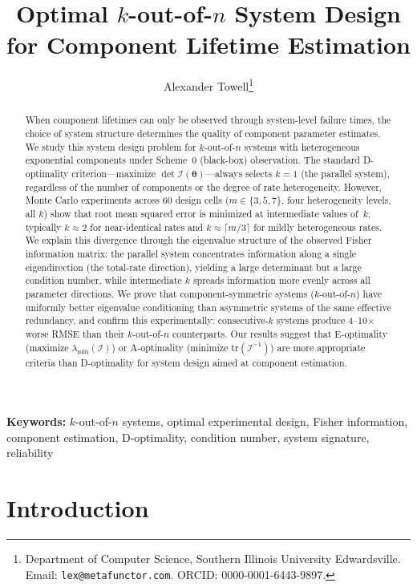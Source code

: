 \documentclass[12pt]{article}
\title{Optimal \texorpdfstring{$k$}{k}-out-of-\texorpdfstring{$n$}{n} System Design\\ for Component Lifetime Estimation}
\author{Alexander Towell\thanks{Department of Computer Science,
  Southern Illinois University Edwardsville.
  Email: \texttt{lex@metafunctor.com}.
  ORCID: 0000-0001-6443-9897.}}
\date{}
\theoremstyle{definition}
\theoremstyle{remark}
\newcommand{\tr}{\mathrm{tr}}
\newcommand{\bthet}{\boldsymbol{\theta}}
\begin{document}
\maketitle

\begin{abstract}
When component lifetimes can only be observed through system-level
failure times, the choice of system structure determines the quality
of component parameter estimates.  We study this system design problem
for $k$-out-of-$n$ systems with heterogeneous exponential components
under Scheme~0 (black-box) observation.  The standard D-optimality
criterion---maximize $\det \mathcal{I}(\bthet)$---always selects
$k = 1$ (the parallel system), regardless of the number of components
or the degree of rate heterogeneity.  However, Monte Carlo experiments
across 60 design cells ($m \in \{3, 5, 7\}$, four heterogeneity
levels, all $k$) show that root mean squared error is minimized at
intermediate values of~$k$, typically $k \approx 2$ for near-identical
rates and $k \approx \lceil m/3 \rceil$ for mildly heterogeneous
rates.  We explain this divergence through the eigenvalue structure of
the observed Fisher information matrix: the parallel system
concentrates information along a single eigendirection (the total-rate
direction), yielding a large determinant but a large condition number,
while intermediate $k$ spreads information more evenly across all
parameter directions.  We prove that component-symmetric systems
($k$-out-of-$n$) have uniformly better eigenvalue conditioning than
asymmetric systems of the same effective redundancy, and confirm this
experimentally: consecutive-$k$ systems produce 4--10$\times$ worse
RMSE than their $k$-out-of-$n$ counterparts.  Our results suggest
that E-optimality (maximize $\lambda_{\min}(\mathcal{I})$) or
A-optimality (minimize $\tr(\mathcal{I}^{-1})$) are more appropriate
criteria than D-optimality for system design aimed at component
estimation.
\end{abstract}

\noindent\textbf{Keywords:} $k$-out-of-$n$ systems, optimal
experimental design, Fisher information, component estimation,
D-optimality, condition number, system signature, reliability

\section{Introduction}
\label{sec:intro}
\end{document}
